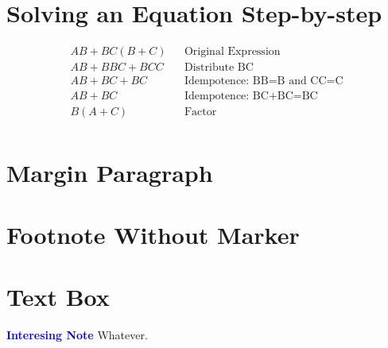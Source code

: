 \section{Solving an Equation Step-by-step}
\begin{align}
	\label{04:soln:solving_equation_one}
	AB+BC(B+C) && \text{Original Expression} \\
	\nonumber
	AB+BBC+BCC && \text{Distribute BC} \\
	\nonumber
	AB+BC+BC && \text{Idempotence: BB=B and CC=C} \\
	\nonumber
	AB+BC && \text{Idempotence: BC+BC=BC} \\
	\nonumber
	B(A+C) && \text{Factor} \\
\end{align}

\section{Margin Paragraph} 

\section{Footnote Without Marker} 

\section{Text Box}
\begin{tcolorbox}[colback=blue!5!white,colframe=blue!75!black]
	\textcolor{blue}{\textbf{Interesing Note}}
	\tcblower
	Whatever.
\end{tcolorbox}


